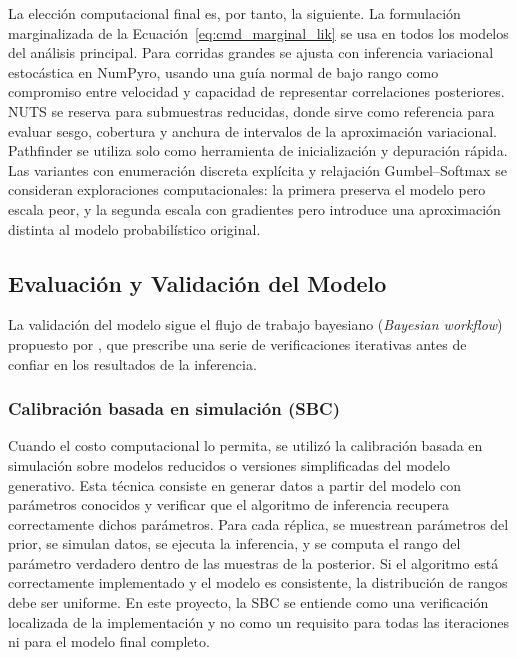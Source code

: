 \documentclass[stu, 12pt, letterpaper, donotrepeattitle, floatsintext, natbib]{apa7_ula}
\begin{document}
La elección computacional final es, por tanto, la siguiente. La
formulación marginalizada de la Ecuación~\ref{eq:cmd_marginal_lik} se
usa en todos los modelos del análisis principal. Para corridas grandes
se ajusta con inferencia variacional estocástica en NumPyro, usando una
guía normal de bajo rango como compromiso entre velocidad y capacidad
de representar correlaciones posteriores. NUTS se reserva para
submuestras reducidas, donde sirve como referencia para evaluar sesgo,
cobertura y anchura de intervalos de la aproximación variacional.
Pathfinder se utiliza solo como herramienta de inicialización y
depuración rápida. Las variantes con enumeración discreta explícita y
relajación Gumbel--Softmax se consideran exploraciones computacionales:
la primera preserva el modelo pero escala peor, y la segunda escala con
gradientes pero introduce una aproximación distinta al modelo
probabilístico original.

\subsection{Evaluación y Validación del Modelo}

La validación del modelo sigue el flujo de trabajo bayesiano
(\textit{Bayesian workflow}) propuesto por \citet{gelman2020bayesian},
que prescribe una serie de verificaciones iterativas antes de
confiar en los resultados de la inferencia.

\subsubsection{Calibración basada en simulación (SBC)}
Cuando el costo computacional lo permita, se utilizó la
calibración basada en simulación \citep{Talts_2018} sobre modelos
reducidos o versiones simplificadas del modelo generativo. Esta
técnica consiste en generar datos a partir del modelo con parámetros
conocidos y verificar que el algoritmo de inferencia recupera
correctamente dichos parámetros. Para cada réplica, se muestrean
parámetros del prior, se simulan datos, se ejecuta la inferencia, y
se computa el rango del parámetro verdadero dentro de las muestras de
la posterior. Si el algoritmo está correctamente implementado y el
modelo es consistente, la distribución de rangos debe ser uniforme.
En este proyecto, la SBC se entiende como una verificación localizada
de la implementación y no como un requisito para todas las
iteraciones ni para el modelo final completo.

\end{document}
